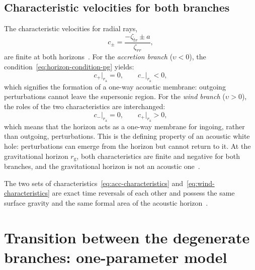 \documentclass[12pt,a4paper,preprint]{elsarticle}
\begin{document}
        \subsection{Characteristic velocities for both branches}\label{subsec:characteristics-both}
            The characteristic velocities for radial rays,
            \begin{equation}
                c_{\pm} = \frac{-\zeta_{\check{t}r} \pm a}{\zeta_{rr}},
                \label{eq:characteristic-speeds}
            \end{equation}
            are finite at both horizons~\cite{SemyannikovAV_GlobalAcousticGeometryOfMichelFlowInPainleveGullstrandCoordinates_2026}. For the \emph{accretion branch} ($\upsilon < 0$), the condition~\eqref{eq:horizon-condition-pg} yields:
            \begin{equation}
                c_{+}\big|_{r_{\mathrm{a}}} = 0, \qquad c_{-}\big|_{r_{\mathrm{a}}} < 0,
                \label{eq:acc-characteristics}
            \end{equation}
            which signifies the formation of a one-way acoustic membrane: outgoing perturbations cannot leave the supersonic region. For the \emph{wind branch} ($\upsilon > 0$), the roles of the two characteristics are interchanged:
            \begin{equation}
                c_{-}\big|_{r_{\mathrm{a}}} = 0, \qquad c_{+}\big|_{r_{\mathrm{a}}} > 0,
                \label{eq:wind-characteristics}
            \end{equation}
            which means that the horizon acts as a one-way membrane for ingoing, rather than outgoing, perturbations. This is the defining property of an acoustic white hole: perturbations can emerge from the horizon but cannot return to it. At the gravitational horizon $r_{\mathrm{g}}$, both characteristics are finite and negative for both branches, and the gravitational horizon is not an acoustic one~\cite{SemyannikovAV_GlobalAcousticGeometryOfMichelFlowInPainleveGullstrandCoordinates_2026}.
            
            The two sets of characteristics~\eqref{eq:acc-characteristics} and~\eqref{eq:wind-characteristics} are exact time reversals of each other and possess the same surface gravity and the same formal area of the acoustic horizon~\cite{SemyannikovAV_AcousticGeometryAndSoundRayDynamicsInRelativisticSphericalAccretion_2026}.

    \section{Transition between the degenerate branches: one-parameter model}\label{sec:transition-model}
\end{document}
